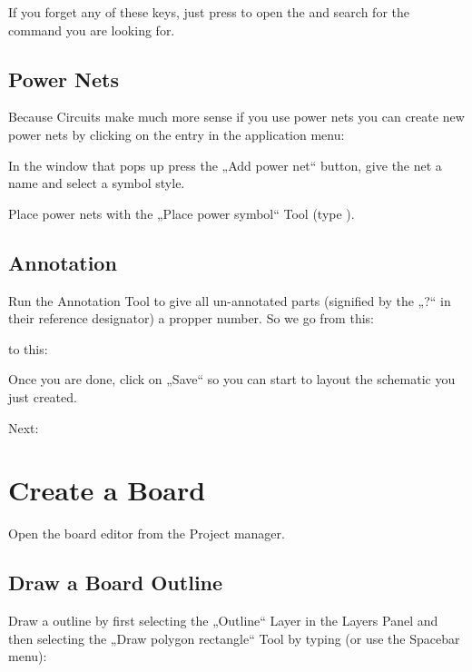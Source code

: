 \documentclass[letterpaper,10pt,czech]{sphinxmanual}
\begin{document}
If you forget any of these keys, just press  to open the {\hyperref[\detokenize{spacebar-menu::doc}]{}} and search for the command you are looking for.


\section{Power Nets}
\label{\detokenize{draw-schematic:power-nets}}
Because Circuits make much more sense if you use power nets you can create new power nets by clicking on the entry in the application menu:

\noindent{}

In the window that pops up press the „Add power net“ button, give the net a name and select a symbol style.

Place power nets with the „Place power symbol“ Tool (type ).


\section{Annotation}
\label{\detokenize{draw-schematic:annotation}}
Run the Annotation Tool to give all un-annotated parts (signified by the „?“ in their reference designator) a propper number. So we go from this:

\noindent{}

to this:

\noindent{}

Once you are done, click on „Save“ so you can start to layout the schematic you just created.

Next: {\hyperref[\detokenize{create-board::doc}]{}}


\chapter{Create a Board}
\label{\detokenize{create-board:create-a-board}}\label{\detokenize{create-board::doc}}
Open the board editor from the Project manager.

\noindent{}


\section{Draw a Board Outline}
\label{\detokenize{create-board:draw-a-board-outline}}
Draw a outline by first selecting the „Outline“ Layer in the Layers Panel and then selecting the „Draw polygon rectangle“ Tool by typing  (or use the Spacebar menu):
\end{document}
